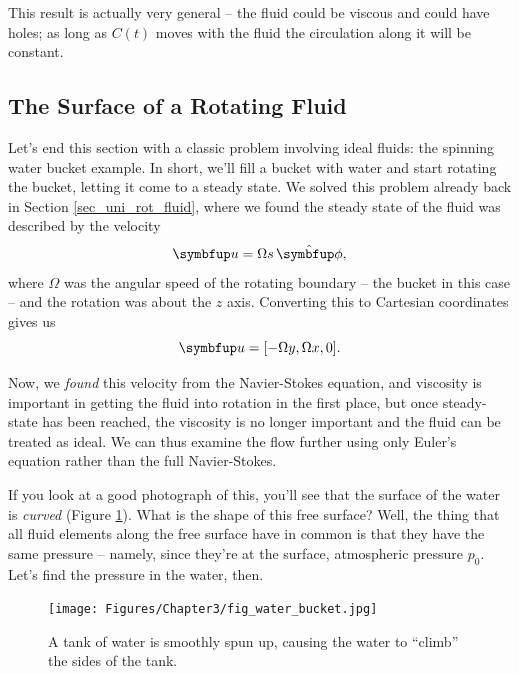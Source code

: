 This result is actually very general -- the fluid could be viscous and could have holes; as long as $C(t)$ moves with the fluid the circulation along it will be constant.





\subsection{The Surface of a Rotating Fluid}

Let's end this section with a classic problem involving ideal fluids: the spinning water bucket example.  In short, we'll fill a bucket with water and start rotating the bucket, letting it come to a steady state.  We solved this problem already back in Section \ref{sec_uni_rot_fluid}, where we found the steady state of the fluid was described by the velocity
\[
\uu = \Omega s \, \unit{\phi},
\]
where $\Omega$ was the angular speed of the rotating boundary -- the bucket in this case -- and the rotation was about the $z$ axis.  Converting this to Cartesian coordinates gives us
\begin{equation}
\label{eq_bucket_vel}
\uu = [-\Omega y, \Omega x, 0].
\end{equation}

Now, we \emph{found} this velocity from the Navier-Stokes equation, and viscosity is important in getting the fluid into rotation in the first place, but once steady-state has been reached, the viscosity is no longer important and the fluid can be treated as ideal.  We can thus examine the flow further using only Euler's equation rather than the full Navier-Stokes.

If you look at a good photograph of this, you'll see that the surface of the water is \emph{curved} (Figure \ref{fig_bucket}).  What is the shape of this free surface?  Well, the thing that all fluid elements along the free surface have in common is that they have the same pressure -- namely, since they're at the surface, atmospheric pressure $p_0$.  Let's find the pressure in the water, then.

\begin{figure}[t]
\centering\texttt{[image: Figures/Chapter3/fig\_water\_bucket.jpg]}
\caption{A tank of water is smoothly spun up, causing the water to ``climb'' the sides of the tank.}
\label{fig_bucket}
\end{figure}

